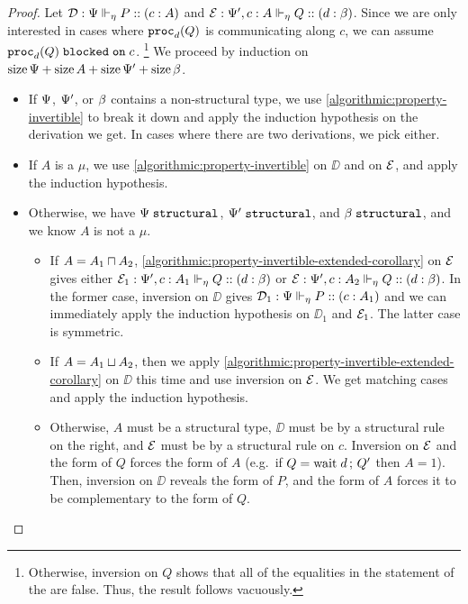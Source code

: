 \begin{proof}
  Let $\mathcal{D} : {\Psi} \Vdash_{\eta} P :: (c : A)$ and $\mathcal{E} : {\Psi', c : A} \Vdash_{\eta} Q :: (d : \beta)$. Since we are only interested in cases where $\mathtt{proc}_{d}(Q)$ is communicating along $c$, we can assume ${\mathtt{proc}_{d}(Q)}\;\mathtt{blocked\;on}\;{c}$.%
\footnote{Otherwise, inversion on $Q$ shows that all of the equalities in the statement of the  are false. Thus, the result follows vacuously.} We proceed by induction on $\operatorname{size}\Psi + \operatorname{size} A + \operatorname{size}{\Psi'} + \operatorname{size}\beta$.
  \begin{itemize}
    \item If $\Psi$, $\Psi'$, or $\beta$ contains a non-structural type, we use \cref{algorithmic:property-invertible} to break it down and apply the induction hypothesis on the derivation we get. In cases where there are two derivations, we pick either.
    \item If $A$ is a $\mu$, we use \cref{algorithmic:property-invertible} on $\DD$ and on $\mathcal{E}$, and apply the induction hypothesis.
    \item Otherwise, we have $\Psi\;\mathtt{structural}$, $\Psi'\;\mathtt{structural}$, and $\beta\;\mathtt{structural}$, and we know $A$ is not a $\mu$.
    \begin{itemize}
      \item If $A = A_1 \mathbin{\sqcap} A_2$, \cref{algorithmic:property-invertible-extended-corollary} on $\mathcal{E}$ gives either $\mathcal{E}_1 : {\Psi', c : A_1} \Vdash_{\eta} Q :: (d : \beta)$ or $\mathcal{E} : {\Psi', c : A_2} \Vdash_{\eta} Q :: (d : \beta)$. In the former case, inversion on $\DD$ gives $\mathcal{D}_1 : {\Psi} \Vdash_{\eta} P :: (c : A_1)$ and we can immediately apply the induction hypothesis on $\DD_1$ and $\mathcal{E}_1$. The latter case is symmetric.
      \item If $A = A_1 \mathbin{\sqcup} A_2$, then we apply \cref{algorithmic:property-invertible-extended-corollary} on $\DD$ this time and use inversion on $\mathcal{E}$. We get matching cases and apply the induction hypothesis.
      \item Otherwise, $A$ must be a structural type, $\DD$ must be by a structural rule on the right, and $\mathcal{E}$ must be by a structural rule on $c$. Inversion on $\mathcal{E}$ and the form of $Q$ forces the form of $A$ (e.g.\ if $Q = \mathrm{wait}\;d \,;\, Q'$ then $A = 1$). Then, inversion on $\DD$ reveals the form of $P$, and the form of $A$ forces it to be complementary to the form of $Q$.
    \end{itemize}
  \end{itemize}
\end{proof}


